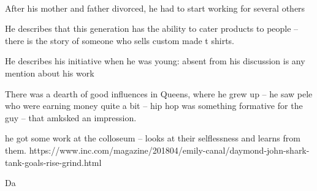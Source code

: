 \breathe \\
After his mother and father divorced, he had to start working for several others

He describes that this generation has the ability to cater products to people -- there
is the story of someone who sells custom made t shirts. 

He describes his initiative when he was young: absent from his discussion is any mention about his work


There was a dearth of good influences in Queens, where he grew up -- he saw pele who were earning money quite a bit -- hip hop was something formative for the guy -- that amksked an impression.

he got some work at the colloseum -- looks at their selflessness and learns from them.
https://www.inc.com/magazine/201804/emily-canal/daymond-john-shark-tank-goals-rise-grind.html


Da
